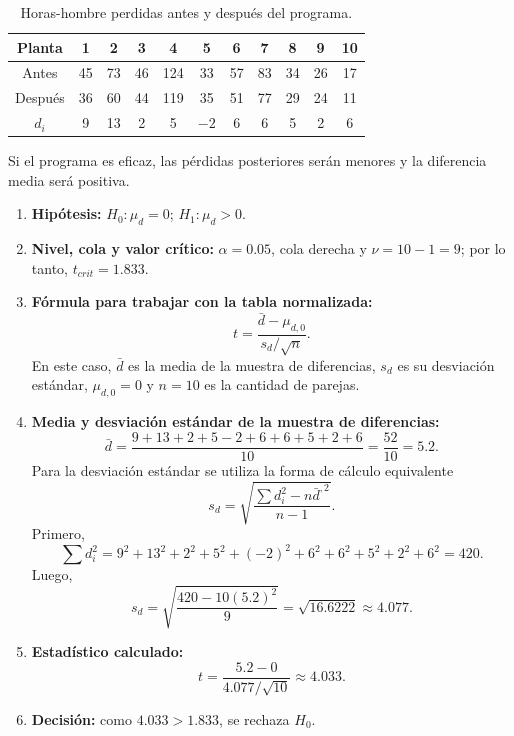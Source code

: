\documentclass[11pt,a4paper]{article}
\newcommand{\Hcero}{H_0}
\newcommand{\Huno}{H_1}
\begin{document}
\begin{table}[H]
\centering
\caption{Horas-hombre perdidas antes y después del programa.}
\begingroup
\scriptsize
\setlength{\tabcolsep}{4pt}
\begin{tabular}{c*{10}{c}}
\toprule
\rowcolor{azulclaro}
\textbf{Planta} & 1 & 2 & 3 & 4 & 5 & 6 & 7 & 8 & 9 & 10\\
\midrule
Antes   & 45 & 73 & 46 & 124 & 33 & 57 & 83 & 34 & 26 & 17\\
Después & 36 & 60 & 44 & 119 & 35 & 51 & 77 & 29 & 24 & 11\\
\rowcolor{grisclaro}
$d_i$   & 9  & 13 & 2  & 5   & $-2$ & 6 & 6 & 5 & 2 & 6\\
\bottomrule
\end{tabular}
\endgroup
\end{table}

Si el programa es eficaz, las pérdidas posteriores serán menores y la diferencia media será positiva.

\begin{enumerate}[label=\textbf{\arabic*.}]
\item \textbf{Hipótesis:} $\Hcero:\mu_d=0$; $\Huno:\mu_d>0$.

\item \textbf{Nivel, cola y valor crítico:} $\alpha=0.05$, cola derecha y $\nu=10-1=9$; por lo tanto, $t_{crit}=1.833$.

\item \textbf{Fórmula para trabajar con la tabla normalizada:}
\[
t=\frac{\bar d-\mu_{d,0}}{s_d/\sqrt n}.
\]
En este caso, $\bar d$ es la media de la muestra de diferencias, $s_d$ es su desviación estándar, $\mu_{d,0}=0$ y $n=10$ es la cantidad de parejas.

\item \textbf{Media y desviación estándar de la muestra de diferencias:}
\[
\bar d=
\frac{9+13+2+5-2+6+6+5+2+6}{10}
=\frac{52}{10}=5.2.
\]
Para la desviación estándar se utiliza la forma de cálculo equivalente
\[
s_d=\sqrt{\frac{\sum d_i^2-n\bar d^{,2}}{n-1}}.
\]
Primero,
\[
\sum d_i^2
=9^2+13^2+2^2+5^2+(-2)^2+6^2+6^2+5^2+2^2+6^2
=420.
\]
Luego,
\[
s_d=\sqrt{\frac{420-10(5.2)^2}{9}}
=\sqrt{16.6222}\approx4.077.
\]

\item \textbf{Estadístico calculado:}
\[
t=\frac{5.2-0}{4.077/\sqrt{10}}
\approx4.033.
\]

\item \textbf{Decisión:} como $4.033>1.833$, se rechaza $\Hcero$.
\end{enumerate}
\end{document}
